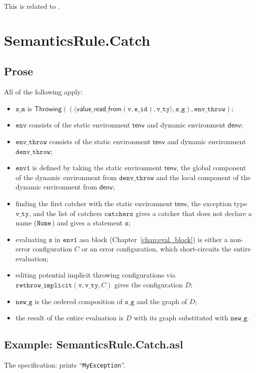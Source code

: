 \documentclass{book}
\newcommand\chapref[1]{Chapter~\ref{chap:#1}}
\newcommand\tenv[0]{\textsf{tenv}}
\newcommand\denv[0]{\textsf{denv}}
\newcommand\ProseOrError[0]{or an error configuration, which short-circuits the entire evaluation}
\newcommand\rethrowimplicit[0]{\texttt{rethrow\_implicit}}
\newcommand\valuereadfrom[0]{\textsf{value\_read\_from}}
\newcommand\Throwing[0]{\textsf{Throwing}}
\newcommand\env[0]{\texttt{env}}
\newcommand\envone[0]{\texttt{env1}}
\newcommand\newg[0]{\texttt{new\_g}}
\newcommand\vv[0]{\texttt{v}}
\newcommand\vs[0]{\texttt{s}}
\newcommand\catchers[0]{\texttt{catchers}}
\newcommand\envthrow[0]{\texttt{env\_throw}}
\newcommand\denvthrow[0]{\texttt{denv\_throw}}
\newcommand\sm[0]{\texttt{s\_m}}
\newcommand\sg[0]{\texttt{s\_g}}
\newcommand\vvty[0]{\texttt{v\_ty}}
\newcommand\eid[0]{\texttt{e\_id}}
\begin{document}
This is related to .

\section{SemanticsRule.Catch \label{sec:SemanticsRule.Catch}}
  \subsection{Prose}
  All of the following apply:
  \begin{itemize}
  \item $\sm$ is $\Throwing((\langle \valuereadfrom(\vv, \eid), \vvty \rangle, \sg), \envthrow)$;
  \item $\env$ consists of the static environment $\tenv$ and dynamic environment $\denv$;
  \item $\envthrow$ consists of the static environment $\tenv$ and dynamic environment \\ $\denvthrow$;
  \item $\envone$ is defined by taking the static environment $\tenv$, the global component of the dynamic
  environment from $\denvthrow$ and the local component of the dynamic environment from $\denv$;
  \item finding the first catcher with the static environment $\tenv$, the exception type $\vvty$,
  and the list of catchers $\catchers$ gives a catcher that does not declare a name ($\texttt{None}$) and gives a statement $\vs$;
  \item evaluating $\vs$ in $\envone$ asa block (\chapref{eval_block}) is either a non-error
  configuration $C$ \ProseOrError;
  \item editing potential implicit throwing configurations via $\rethrowimplicit(\vv, \vvty, C)$
  gives the configuration $D$;
  \item $\newg$ is the ordered composition of $\sg$ and the graph of $D$;
  \item the result of the entire evaluation is $D$ with its graph substituted with $\newg$.
  \end{itemize}

    \subsection{Example: SemanticsRule.Catch.asl}
    The specification:
    prints ``\texttt{MyException}''.
\end{document}
